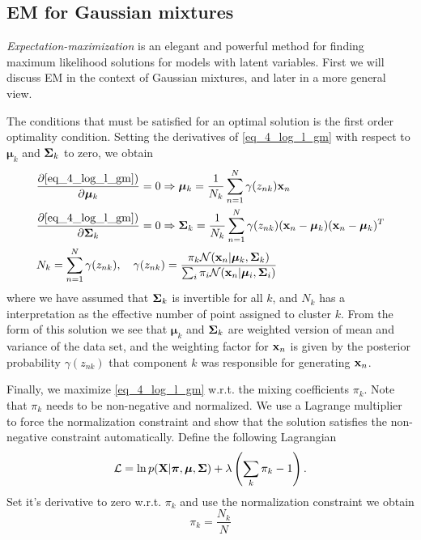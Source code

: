 \documentclass[../book-template.tex]{subfiles}
\begin{document}
\subsection{EM for Gaussian mixtures}
\emph{Expectation-maximization} is an elegant and powerful method for finding maximum likelihood solutions for models with latent variables. First we will discuss EM in the context of Gaussian mixtures, and later in a more general view.
\par The conditions that must be satisfied for an optimal solution is the first order optimality condition. Setting the derivatives of \eqref{eq_4_log_l_gm} with respect to $\bm{\mu}_k$ and ${\bf \Sigma}_k$ to zero, we obtain
\begin{align}
	\label{eq_4_mu}&\frac{\partial \eqref{eq_4_log_l_gm})}{\partial \bm{\mu}_k}=0\Rightarrow \bm{\mu}_k = \frac{1}{N_k}\sum_{n=1}^{N}\gamma(z_{nk}){\bf x}_n\\
	 \label{eq_4_sigma}&\frac{\partial \eqref{eq_4_log_l_gm})}{\partial {\bf \Sigma}_k}=0\Rightarrow {\bf \Sigma}_k=\frac{1}{N_k}\sum_{n=1}^{N}\gamma(z_{nk}) ({\bf x}_n-\bm{\mu}_k)({\bf x}_n-\bm{\mu}_k)^T\\
	 \label{eq_4_gamma}&N_k = \sum_{n=1}^{N}\gamma(z_{nk}), \quad\gamma(z_{nk}) = \frac{\pi_k \mathcal{N}({\bf x}_n|\bm{\mu}_k,{\bf \Sigma}_k)}{\sum_i\pi_i \mathcal{N}({\bf x}_n|\bm{\mu}_i,{\bf \Sigma}_i)} 
\end{align}
where we have assumed that ${\bf \Sigma}_k$ is invertible for all $k$, and $N_k$ has a interpretation as the effective number of point assigned to cluster $k$. From the form of this solution we see that $\bm{\mu}_k$ and ${\bf \Sigma}_k$ are weighted version of mean and variance of the data set, and the weighting factor for ${\bf x}_n$ is given by the posterior probability $\gamma(z_{nk})$ that component $k$ was responsible for generating ${\bf x}_n$.
\par Finally, we maximize \eqref{eq_4_log_l_gm} w.r.t. the mixing coefficients $\pi_k$. Note that $\pi_k$ needs to be non-negative and normalized. We use a Lagrange multiplier to force the normalization constraint and show that the solution satisfies the non-negative constraint automatically. Define the following Lagrangian
\begin{equation*}
	\mathcal{L}=\ln p({\bf X}|\bm{\pi},\bm{\mu},{\bf \Sigma}) + \lambda\left(\sum_k \pi_k-1\right).
\end{equation*}
Set it's derivative to zero w.r.t. $\pi_k$ and use the normalization constraint we obtain
\begin{equation}\label{eq_4_pi}
	\pi_k = \frac{N_k}{N} 
\end{equation}
\end{document}
